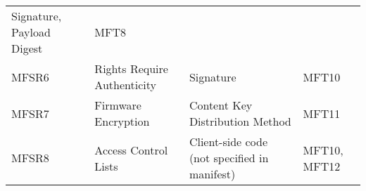 \documentclass[0-thesis.tex]{subfiles}
\begin{document}
\begin{longtable}[]{@{}llll@{}}
    \begin{minipage}[t]{0.34\columnwidth}\raggedright\strut Signature, Payload
    Digest\strut \end{minipage} & \begin{minipage}[t]{0.10\columnwidth}\raggedright\strut
    MFT8\strut \end{minipage}\tabularnewline
    \begin{minipage}[t]{0.16\columnwidth}\raggedright\strut MFSR6\strut \end{minipage} &
    \begin{minipage}[t]{0.29\columnwidth}\raggedright\strut Rights Require
    Authenticity\strut \end{minipage} &
    \begin{minipage}[t]{0.34\columnwidth}\raggedright\strut Signature\strut \end{minipage}
    & \begin{minipage}[t]{0.10\columnwidth}\raggedright\strut MFT10\strut
    \end{minipage}\tabularnewline
    \begin{minipage}[t]{0.16\columnwidth}\raggedright\strut MFSR7\strut \end{minipage} &
    \begin{minipage}[t]{0.29\columnwidth}\raggedright\strut Firmware Encryption\strut
    \end{minipage} & \begin{minipage}[t]{0.34\columnwidth}\raggedright\strut Content Key
    Distribution Method\strut \end{minipage} &
    \begin{minipage}[t]{0.10\columnwidth}\raggedright\strut MFT11\strut
    \end{minipage}\tabularnewline
    \begin{minipage}[t]{0.16\columnwidth}\raggedright\strut MFSR8\strut \end{minipage} &
    \begin{minipage}[t]{0.29\columnwidth}\raggedright\strut Access Control Lists\strut
    \end{minipage} & \begin{minipage}[t]{0.34\columnwidth}\raggedright\strut Client-side
    code (not specified in manifest)\strut \end{minipage} &
    \begin{minipage}[t]{0.10\columnwidth}\raggedright\strut MFT10, MFT12\strut
    \end{minipage}\tabularnewline
    \bottomrule
\end{longtable}
\end{document}

